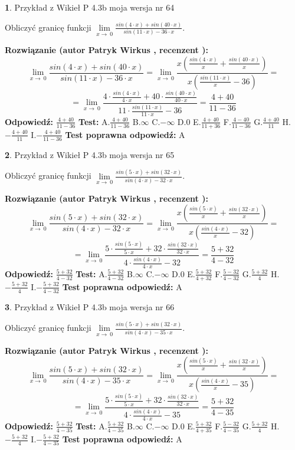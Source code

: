 \documentclass[12pt, a4paper]{article}
\theoremstyle{definition} %
\newtheorem{zad}{}
\newcommand{\zadStart}[1]{\begin{zad}#1\newline}
\newcommand{\zadStop}{\end{zad}}
\newcommand{\rozwStart}[2]{\noindent \textbf{Rozwiązanie (autor #1 , recenzent #2): }\newline}
\newcommand{\rozwStop}{\newline}
\newcommand{\odpStart}{\noindent \textbf{Odpowiedź:}\newline}
\newcommand{\odpStop}{\newline}
\newcommand{\testStart}{\noindent \textbf{Test:}\newline}
\newcommand{\testStop}{\newline}
\newcommand{\kluczStart}{\noindent \textbf{Test poprawna odpowiedź:}\newline}
\newcommand{\kluczStop}{\newline}
\begin{document}
\zadStart{Przykład z Wikieł P 4.3b moja wersja nr 64}


Obliczyć granicę funkcji $\lim\limits_{x\to\ 0}\frac{sin(4 \cdot x)+sin(40 \cdot x)}{sin(11 \cdot x)-36 \cdot x}$.
\zadStop
\rozwStart{Patryk Wirkus}{}
$$\lim\limits_{x\to\ 0}\frac{sin(4 \cdot x)+sin(40 \cdot x)}{sin(11 \cdot x)-36 \cdot x}=\lim\limits_{x\to\ 0}\frac{x(\frac{sin(4 \cdot x)}{x}+\frac{sin(40 \cdot x)}{x})}{x(\frac{sin(11 \cdot x)}{x}-36)}=$$
$$=\lim\limits_{x\to\ 0}\frac{4 \cdot \frac{sin(4 \cdot x)}{4 \cdot x}+40 \cdot \frac{sin(40 \cdot x)}{40 \cdot x}}{11 \cdot \frac{sin(11 \cdot x)}{11 \cdot x}-36}=\frac{4+40}{11-36}$$
\rozwStop
\odpStart
$\frac{4+40}{11-36}$
\odpStop
\testStart
A.$\frac{4+40}{11-36}$
B.$\infty$
C.$-\infty$
D.$0$
E.$\frac{4+40}{11+36}$
F.$\frac{4-40}{11-36}$
G.$\frac{4+40}{11}$
H.$-\frac{4+40}{11}$
I.$-\frac{4+40}{11-36}$
\testStop
\kluczStart
A
\kluczStop



\zadStart{Przykład z Wikieł P 4.3b moja wersja nr 65}


Obliczyć granicę funkcji $\lim\limits_{x\to\ 0}\frac{sin(5 \cdot x)+sin(32 \cdot x)}{sin(4 \cdot x)-32 \cdot x}$.
\zadStop
\rozwStart{Patryk Wirkus}{}
$$\lim\limits_{x\to\ 0}\frac{sin(5 \cdot x)+sin(32 \cdot x)}{sin(4 \cdot x)-32 \cdot x}=\lim\limits_{x\to\ 0}\frac{x(\frac{sin(5 \cdot x)}{x}+\frac{sin(32 \cdot x)}{x})}{x(\frac{sin(4 \cdot x)}{x}-32)}=$$
$$=\lim\limits_{x\to\ 0}\frac{5 \cdot \frac{sin(5 \cdot x)}{5 \cdot x}+32 \cdot \frac{sin(32 \cdot x)}{32 \cdot x}}{4 \cdot \frac{sin(4 \cdot x)}{4 \cdot x}-32}=\frac{5+32}{4-32}$$
\rozwStop
\odpStart
$\frac{5+32}{4-32}$
\odpStop
\testStart
A.$\frac{5+32}{4-32}$
B.$\infty$
C.$-\infty$
D.$0$
E.$\frac{5+32}{4+32}$
F.$\frac{5-32}{4-32}$
G.$\frac{5+32}{4}$
H.$-\frac{5+32}{4}$
I.$-\frac{5+32}{4-32}$
\testStop
\kluczStart
A
\kluczStop



\zadStart{Przykład z Wikieł P 4.3b moja wersja nr 66}


Obliczyć granicę funkcji $\lim\limits_{x\to\ 0}\frac{sin(5 \cdot x)+sin(32 \cdot x)}{sin(4 \cdot x)-35 \cdot x}$.
\zadStop
\rozwStart{Patryk Wirkus}{}
$$\lim\limits_{x\to\ 0}\frac{sin(5 \cdot x)+sin(32 \cdot x)}{sin(4 \cdot x)-35 \cdot x}=\lim\limits_{x\to\ 0}\frac{x(\frac{sin(5 \cdot x)}{x}+\frac{sin(32 \cdot x)}{x})}{x(\frac{sin(4 \cdot x)}{x}-35)}=$$
$$=\lim\limits_{x\to\ 0}\frac{5 \cdot \frac{sin(5 \cdot x)}{5 \cdot x}+32 \cdot \frac{sin(32 \cdot x)}{32 \cdot x}}{4 \cdot \frac{sin(4 \cdot x)}{4 \cdot x}-35}=\frac{5+32}{4-35}$$
\rozwStop
\odpStart
$\frac{5+32}{4-35}$
\odpStop
\testStart
A.$\frac{5+32}{4-35}$
B.$\infty$
C.$-\infty$
D.$0$
E.$\frac{5+32}{4+35}$
F.$\frac{5-32}{4-35}$
G.$\frac{5+32}{4}$
H.$-\frac{5+32}{4}$
I.$-\frac{5+32}{4-35}$
\testStop
\kluczStart
A
\kluczStop
\end{document}

